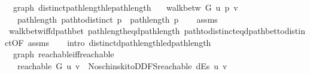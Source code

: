 \begin{isabellebody}
\endisatagproof
{\isafoldproof}%
%
\isadelimproof
\isanewline
%
\endisadelimproof
%
\isadeliminvisible
\isanewline
%
\endisadeliminvisible
%
\isataginvisible
{}\isamarkupfalse%
\ {\isacharparenleft}{\kern0pt}\ graph{\isacharparenright}{\kern0pt}\ distinct{\isacharunderscore}{\kern0pt}path{\isacharunderscore}{\kern0pt}length{\isacharunderscore}{\kern0pt}le{\isacharunderscore}{\kern0pt}path{\isacharunderscore}{\kern0pt}length{\isacharcolon}{\kern0pt}\isanewline
\ \ \ {\isachardoublequoteopen}walk{\isacharunderscore}{\kern0pt}betw\ G\ u\ p\ v{\isachardoublequoteclose}\isanewline
\ \ \ {\isachardoublequoteopen}path{\isacharunderscore}{\kern0pt}length\ {\isacharparenleft}{\kern0pt}path{\isacharunderscore}{\kern0pt}to{\isacharunderscore}{\kern0pt}distinct\ p{\isacharparenright}{\kern0pt}\ {\isasymle}\ path{\isacharunderscore}{\kern0pt}length\ p{\isachardoublequoteclose}%
\endisataginvisible
{\isafoldinvisible}%
%
\isadeliminvisible
\isanewline
%
\endisadeliminvisible
%
\isadelimproof
\ \ %
\endisadelimproof
%
\isatagproof
{}\isamarkupfalse%
\ assms\isanewline
\ \ \isamarkupfalse%
\ walk{\isacharunderscore}{\kern0pt}betw{\isacharunderscore}{\kern0pt}iff{\isacharunderscore}{\kern0pt}dpath{\isacharunderscore}{\kern0pt}bet\ path{\isacharunderscore}{\kern0pt}length{\isacharunderscore}{\kern0pt}eq{\isacharunderscore}{\kern0pt}dpath{\isacharunderscore}{\kern0pt}length\ path{\isacharunderscore}{\kern0pt}to{\isacharunderscore}{\kern0pt}distinct{\isacharunderscore}{\kern0pt}eq{\isacharunderscore}{\kern0pt}dpath{\isacharunderscore}{\kern0pt}bet{\isacharunderscore}{\kern0pt}to{\isacharunderscore}{\kern0pt}distinct{\isacharbrackleft}{\kern0pt}OF\ assms{\isacharbrackright}{\kern0pt}\isanewline
\ \ \isamarkupfalse%
\ {\isacharparenleft}{\kern0pt}intro\ distinct{\isacharunderscore}{\kern0pt}dpath{\isacharunderscore}{\kern0pt}length{\isacharunderscore}{\kern0pt}le{\isacharunderscore}{\kern0pt}dpath{\isacharunderscore}{\kern0pt}length{\isacharparenright}{\kern0pt}%
\endisatagproof
{\isafoldproof}%
%
\isadelimproof
\isanewline
%
\endisadelimproof
\isanewline
{}\isamarkupfalse%
\ {\isacharparenleft}{\kern0pt}\ graph{\isacharparenright}{\kern0pt}\ reachable{\isacharunderscore}{\kern0pt}iff{\isacharunderscore}{\kern0pt}reachable{\isacharcolon}{\kern0pt}\isanewline
\ \ \ {\isachardoublequoteopen}reachable\ G\ u\ v\ {\isasymlongleftrightarrow}\ Noschinski{\isacharunderscore}{\kern0pt}to{\isacharunderscore}{\kern0pt}DDFS{\isachardot}{\kern0pt}reachable\ dEs\ u\ v{\isachardoublequoteclose}\isanewline

\end{isabellebody}
